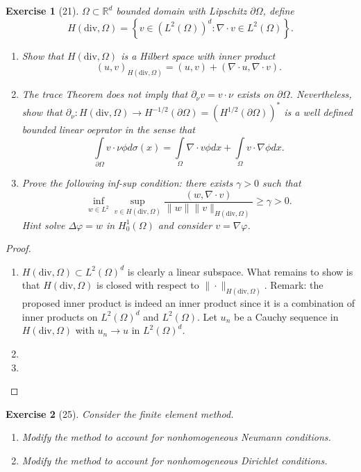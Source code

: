 \documentclass[letterpaper,twoside,11pt]{article}
\theoremstyle{mystyle}
\newtheorem*{exercise}{Exercise}
\newcommand{\R}{{\mathbb R}}
\newcommand{\cbk}{\color{black}}
\newcommand{\cblu}{\color{blue}}
\newcommand{\Hdiv}{H\left( \text{div}, \Omega \right)}
\newcommand{\Ltwo}{L^2 \left( \Omega \right)}
\begin{document}
\newpage 
\begin{exercise}[21]
  $\Omega \subset \R^d$ bounded domain with Lipschitz $\partial \Omega$, define 
  \[H\left( \text{div}, \Omega \right) = \left\{ v\in (L^2(\Omega))^d : \nabla \cdot v \in L^2 (\Omega )\right\}.\]
\begin{enumerate}
  \item Show that $H\left( \text{div}, \Omega \right)$ is a Hilbert space with inner product 
  \[\left( u,v \right)_{H(\text{div}, \Omega)} = \left( u,v \right) + \left( \nabla \cdot u, \nabla \cdot v \right).\]
  \item The trace Theorem does not imply that $\partial_\nu v = v \cdot \nu$ exists on $\partial \Omega$. Nevertheless, show that $\partial_\nu : H\left( \text{div}, \Omega \right) \to H^{-1/2} \left( \partial \Omega \right) = \left( H^{1/2}(\partial \Omega) \right)^*$ is a well defined bounded linear oeprator in the sense that 
  \[\int\limits_{\partial \Omega} v \cdot \nu \phi d\sigma(x) = \int\limits_{\Omega} \nabla \cdot v \phi dx + \int\limits_{\Omega} v\cdot \nabla \phi dx.\]
  \item Prove the following inf-sup condition: there exists $\gamma > 0$ such that 
  \[\inf_{w\in L^2} \sup_{v\in H(\text{div},\Omega)} \frac{(w, \nabla \cdot v)}{\|w\| \|v\|_{H(\text{div}, \Omega)}}\geq \gamma > 0.\]
  Hint solve $\Delta \varphi = w$ in $H_0^1 \left( \Omega \right)$ and consider $v  = \nabla \varphi$. 

\end{enumerate}
\end{exercise}

\cblu
\begin{proof}
  \begin{enumerate}
    \item $\Hdiv \subset \Ltwo^d$ is clearly a linear subspace. What remains to show is that $\Hdiv$ is closed with respect to $\|\cdot\|_{\Hdiv}$. Remark: the proposed inner product is indeed an inner product since it is a combination of inner products on $\Ltwo^d$ and $\Ltwo$. Let $u_n$ be a Cauchy sequence in $\Hdiv$ with $u_n \to u$ in $\Ltwo^d$. 
    
    \item 
    \item 
  \end{enumerate}
\end{proof}
\cbk 




\newpage 
\begin{exercise}[25] 
  Consider the finite element method. 
  \begin{enumerate}
    \item Modify the method to account for nonhomogeneous Neumann conditions. 
    \item Modify the method to account for nonhomogeneous Dirichlet conditions. 
  \end{enumerate}
\end{exercise}
\end{document}
